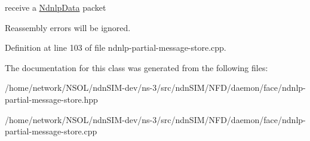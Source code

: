 receive a \hyperlink{classnfd_1_1ndnlp_1_1NdnlpData}{Ndnlp\+Data} packet 

Reassembly errors will be ignored. 

Definition at line 103 of file ndnlp-\/partial-\/message-\/store.\+cpp.



The documentation for this class was generated from the following files\+:\begin{DoxyCompactItemize}
\item 
/home/network/\+N\+S\+O\+L/ndn\+S\+I\+M-\/dev/ns-\/3/src/ndn\+S\+I\+M/\+N\+F\+D/daemon/face/ndnlp-\/partial-\/message-\/store.\+hpp\item 
/home/network/\+N\+S\+O\+L/ndn\+S\+I\+M-\/dev/ns-\/3/src/ndn\+S\+I\+M/\+N\+F\+D/daemon/face/ndnlp-\/partial-\/message-\/store.\+cpp\end{DoxyCompactItemize}
